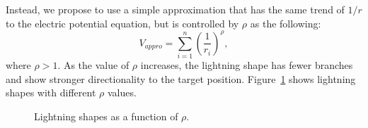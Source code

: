 


Instead, we propose to use a simple approximation that has the same trend of
$1/r$ to the electric potential equation, but is controlled by $\rho$ as the
following:
\begin{equation} \label{eq_our_ep}
V_{appro} = \sum_{i=1}^{n}(\frac{1}{r_{i}})^{\rho},
\end{equation}
where $\rho > 1$.
As the value of $\rho$ increases, the lightning shape has fewer branches and
show stronger directionality to the target position. Figure~\ref{fig_comp_rho}
shows lightning shapes with different $\rho$ values.

\begin{figure}[t]
	\centering
	\caption{Lightning shapes as a function of $\rho$.}
	\label{fig_comp_rho}
\end{figure}



